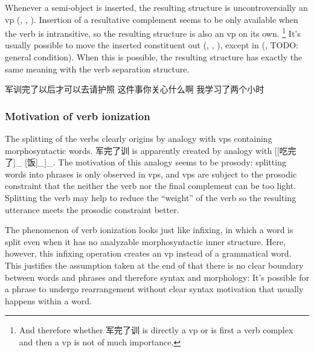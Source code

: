 \documentclass[UTF8, a4paper, oneside, scheme=plain, 12pt]{ctexrep}
\begin{document}
Whenever a semi-object is inserted, 
the resulting structure is uncontroversially an \acs{vp}
(, , ).
Insertion of a resultative complement 
seems to be only available when the verb is intransitive,
so the resulting structure is also an \acs{vp} on its own.%
\footnote{
    And therefore whether 军完了训 is directly a \ac{vp} or is first a verb complex 
    and then a \ac{vp} is not of much importance.
}
It's usually possible to move the inserted constituent out
(,
,
), 
except in (, TODO: general condition).
When this is possible, 
the resulting structure has exactly the same meaning 
with the verb separation structure.

\begin{exe}
    \ex\label{ex:verb-phrase.separation.junxun-2} 军训完了以后才可以去请护照
    \ex\label{ex:verb-phrase.separation.guanxin-2} 这件事你关心什么啊
    \ex\label{ex:verb-phrase.separation.xuexi-2} 我学习了两个小时
\end{exe}

\subsubsection{Motivation of verb ionization}

The splitting of the verbs clearly origins 
by analogy with \ac{vp}s containing morphosyntactic words.
军完了训 is apparently created by analogy with 
[[吃完了]_{} [饭]_{}]_{}.
The motivation of this analogy seems to be prosody: 
splitting words into phrases is only observed in \ac{vp}s,
and \ac{vp}s are subject to the prosodic constraint 
that the neither the verb nor the final complement can be too light.
Splitting the verb may help to reduce the ``weight'' of the verb 
so the resulting utterance meets the prosodic constraint better.

The phenomenon of verb ionization
looks just like infixing,
in which a word is split even when it has no analyzable morphosyntactic inner structure.
Here, however, this infixing operation creates an \acs{vp} instead of a grammatical word.
This justifies the assumption taken at the end of 
that there is no clear boundary between words and phrases 
and therefore syntax and morphology:
It's possible for a phrase to undergo 
rearrangement without clear syntax motivation
that usually happens within a word.
\end{document}
